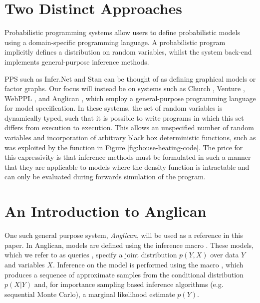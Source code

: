 

\section{Two Distinct Approaches}
\label{sec:probprog:two}

Probabilistic programming systems allow users to define probabilistic models using a domain-specific programming language. A probabilistic program implicitly defines a distribution on random variables, whilst the system back-end implements general-purpose inference methods.  

PPS such as Infer.Net \citep{minka_software_2010} and Stan \citep{carpenter2015stan} can be thought of as defining graphical models or factor graphs.  Our focus will instead be on systems such as Church \citep{goodman_uai_2008}, Venture \citep{mansinghka2014venture}, WebPPL \citep{goodman_book_2014}, and Anglican \citep{wood2014new}, which employ a general-purpose programming language for model specification. In these systems, the set of random variables is dynamically typed, such that it is possible to write programs in which this set differs from execution to execution.  This allows an unspecified number of random variables and incorporation of arbitrary black box deterministic functions, such as was exploited by the \simulatec function in Figure \ref{fig:house-heating-code}. The price for this expressivity is that inference methods must be formulated in such a manner that they are applicable to models where the density function is intractable and can only be evaluated during forwards simulation of the program. 


\section{An Introduction to Anglican}
\label{sec:probprog:anglican}

One such general purpose system, \emph{Anglican}, will be used as a reference in this paper.  In Anglican, models are defined using the inference macro . These models, which we refer to as queries \citep{goodman_uai_2008}, specify a joint distribution $p(Y,X)$ over data $Y$ and variables $X$. Inference on the model is performed using the macro \doquery, which produces a sequence of approximate samples from the conditional distribution $p(X|Y)$ and, for importance sampling based inference algorithms (e.g. sequential Monte Carlo), a marginal likelihood estimate $p(Y)$.  

